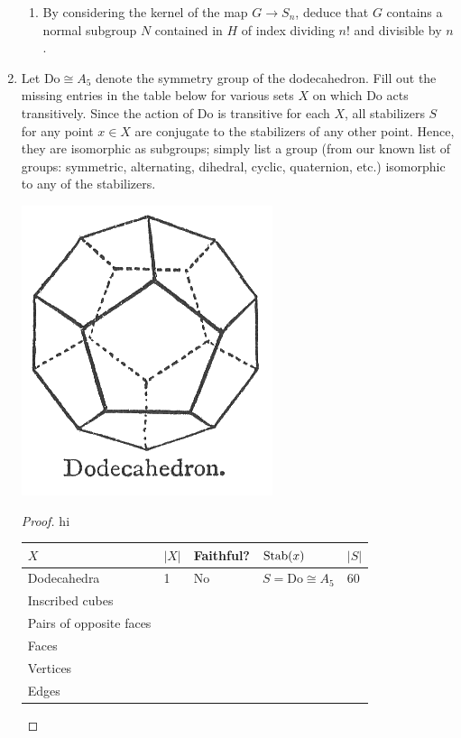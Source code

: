 \documentclass[../psets.tex]{subfiles}
\begin{document}
\begin{enumerate}
\begin{enumerate}
        \item By considering the kernel of the map $G\to S_n$, deduce that $G$ contains a normal subgroup $N$ contained in $H$ of index dividing $n!$ and divisible by $n$.
    \end{enumerate}
    \item Let $\text{Do}\cong A_5$ denote the symmetry group of the dodecahedron. Fill out the missing entries in the table below for various sets $X$ on which $\text{Do}$ acts transitively. Since the action of $\text{Do}$ is transitive for each $X$, all stabilizers $S$ for any point $x\in X$ are conjugate to the stabilizers of any other point. Hence, they are isomorphic as subgroups; simply list a group (from our known list of groups: symmetric, alternating, dihedral, cyclic, quaternion, etc.) isomorphic to any of the stabilizers.
    \begin{center}
        \includegraphics[width=0.18\linewidth]{../ExtFiles/Dodecahedron.png}
    \end{center}
    \begin{proof}
        {\color{white}hi}
        \begin{center}
            \small
            \renewcommand{\arraystretch}{1.2}
            \begin{tabular}{|l|l|l|l|l|}
                \hline
                $X$ & $|X|$ & Faithful? & $\operatorname{Stab}(x)$ & $|S|$\\
                \hline
                Dodecahedra & 1 & No & $S=\text{Do}\cong A_5$ & 60\\
                Inscribed cubes &  &  &  & \\
                Pairs of opposite faces &  &  &  & \\
                Faces &  &  &  & \\
                Vertices &  &  &  & \\
                Edges &  &  &  & \\
                \hline
            \end{tabular}
        \end{center}
    \end{proof}
\end{enumerate}
\end{document}
